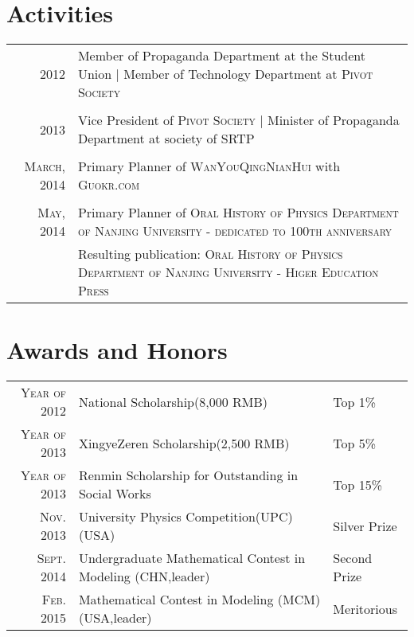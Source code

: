 \documentclass[ENG]{Sketch}
\begin{document}
\section{Activities}
\begin{tabular}{r|p{11cm}}

\textsc{2012} & Member of Propaganda Department at the Student Union | Member of Technology Department at \textsc{Pivot Society} \\
 
 \multicolumn{2}{c}{} \\
 
\textsc{2013} &  Vice President of \textsc{Pivot Society} | Minister of Propaganda Department at society of \textsc{SRTP} \\

 \multicolumn{2}{c}{} \\
 
\textsc{March, 2014} &  Primary Planner of \textsc{WanYouQingNianHui} with \textsc{Guokr.com}\\

 \multicolumn{2}{c}{} \\
 
\textsc{May, 2014} &  Primary Planner of \textsc{Oral History of Physics Department of Nanjing University - dedicated to 100th anniversary} \\ & Resulting publication: \textsc{Oral History of Physics Department of Nanjing University} - \textsc{Higer Education Press}\\

\end{tabular}

\section{Awards and Honors}
\begin{tabular}{rll}
    \textsc{Year of 2012} & National Scholarship\footnotesize(8,000 \textsc{RMB})\normalsize & Top 1\%\\
    \textsc{Year of 2013} & XingyeZeren Scholarship\footnotesize(2,500 \textsc{RMB})\normalsize & Top 5\%\\
    \textsc{Year of 2013} & Renmin Scholarship for Outstanding in Social Works & Top 15\%\\
    \textsc{Nov. 2013} & University Physics Competition(UPC) \footnotesize (USA) \normalsize & Silver Prize \\
    \textsc{Sept. 2014} & Undergraduate Mathematical Contest in Modeling \footnotesize (CHN,leader) \normalsize & Second Prize \\
     \textsc{Feb. 2015} & Mathematical Contest in Modeling (MCM)    \footnotesize (USA,leader) \normalsize &  Meritorious\\
\end{tabular}
\end{document}
